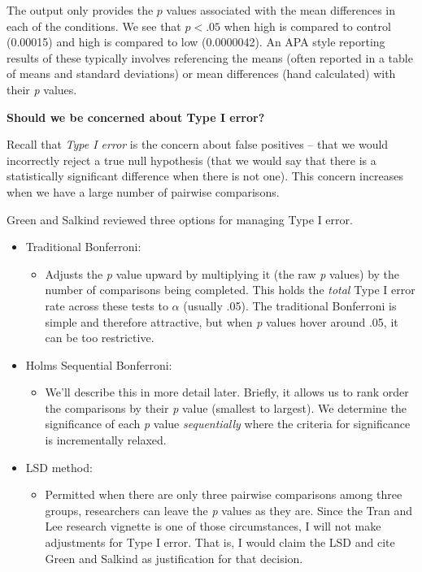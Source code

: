 \documentclass[
  11pt,
]{book}
\providecommand{\tightlist}{%
  \setlength{\itemsep}{0pt}\setlength{\parskip}{0pt}}
\begin{document}
The output only provides the \(p\) values associated with the mean differences in each of the conditions. We see that \(p < .05\) when high is compared to control (0.00015) and high is compared to low (0.0000042). An APA style reporting results of these typically involves referencing the means (often reported in a table of means and standard deviations) or mean differences (hand calculated) with their \emph{p} values.

\textbf{Should we be concerned about Type I error?}

Recall that \emph{Type I error} is the concern about false positives -- that we would incorrectly reject a true null hypothesis (that we would say that there is a statistically significant difference when there is not one). This concern increases when we have a large number of pairwise comparisons.

Green and Salkind \citeyearpar{green_using_2014} reviewed three options for managing Type I error.

\begin{itemize}
\tightlist
\item
  Traditional Bonferroni:

  \begin{itemize}
  \tightlist
  \item
    Adjusts the \emph{p} value upward by multiplying it (the raw \emph{p} values) by the number of comparisons being completed. This holds the \emph{total} Type I error rate across these tests to \(\alpha\) (usually .05). The traditional Bonferroni is simple and therefore attractive, but when \emph{p} values hover around .05, it can be too restrictive.
  \end{itemize}
\item
  Holms Sequential Bonferroni:

  \begin{itemize}
  \tightlist
  \item
    We'll describe this in more detail later. Briefly, it allows us to rank order the comparisons by their \emph{p} value (smallest to largest). We determine the significance of each \emph{p} value \emph{sequentially} where the criteria for significance is incrementally relaxed.
  \end{itemize}
\item
  LSD method:

  \begin{itemize}
  \tightlist
  \item
    Permitted when there are only three pairwise comparisons among three groups, researchers can leave the \emph{p} values as they are. Since the Tran and Lee \citeyearpar{tran_you_2014} research vignette is one of those circumstances, I will not make adjustments for Type I error. That is, I would claim the LSD and cite Green and Salkind \citeyearpar{green_using_2014} as justification for that decision.
  \end{itemize}
\end{itemize}
\end{document}
